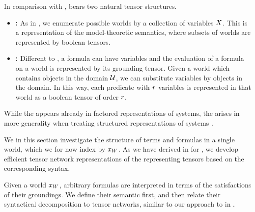 


In comparison with \propositionalLogic{}, \firstOrderLogic{} bears two natural tensor structures.
\begin{itemize}
    \item \textbf{\SemanticStructure{}:} As in \propositionalLogic{}, we enumerate possible worlds by a collection of variables $X$.
    This is a representation of the model-theoretic semantics, where subsets of worlds are represented by boolean tensors.
    \item \textbf{\SubstitutionStructure{}:}
    Different to \propositionalLogic{}, a formula can have variables and the evaluation of a formula on a world is represented by its grounding tensor.
    Given a world which contains objects in the domain $\mathcal{U}$, we can substitute variables by objects in the domain.
    In this way, each predicate with $r$ variables is represented in that world as a boolean tensor of order $r$.
\end{itemize}
While the \semanticStructure{} appears already in factored representations of systems, the \substitutionStructure{} arises in more generality when treating structured representations of systems \cite{russell_artificial_2021}.




We in this section investigate the structure of terms and formulas in a single \firstOrderLogic{} world, which we for now index by $x_{W}$.
As we have derived in  for \propositionalLogic{}, we develop efficient tensor network representations of the representing tensors based on the corresponding syntax.


Given a \firstOrderLogic{} world $x_{W}$, arbitrary formulas are interpreted in terms of the satisfactions of their groundings.
We define their semantic first, and then relate their syntactical decomposition to tensor networks, similar to our approach to \propositionalLogic{} in .

